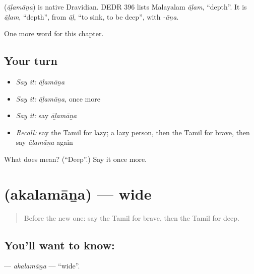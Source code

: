 \begin{cousinweb}
\textbf{} (\emph{āḻamāṉa}) is native Dravidian. DEDR 396 lists Malayalam \emph{āḻam}, \textquotedblleft{}depth\textquotedblright{}. It is \emph{āḻam}, \textquotedblleft{}depth\textquotedblright{}, from \emph{āḻ}, \textquotedblleft{}to sink, to be deep\textquotedblright{}, with \emph{-āṉa}.
\end{cousinweb}

\begin{grammarlens}[title={What you've built}]
One more word for this chapter.
\end{grammarlens}

\subsection*{Your turn}
\begin{itemize}
\raggedright
  \item \emph{Say it:} \emph{āḻamāṉa}
  \item \emph{Say it:} \emph{āḻamāṉa}, once more
  \item \emph{Say it:} say \emph{āḻamāṉa}
  \item \emph{Recall:} say the Tamil for lazy; a lazy person, then the Tamil for brave, then say \emph{āḻamāṉa} again
\end{itemize}

\begin{tcolorbox}[breakable,colback=teal!4,colframe=teal!35!black,title={Before you move on}]
What does  mean? (\textquotedblleft{}Deep\textquotedblright{}.) Say it once more.
\end{tcolorbox}
\section[\texorpdfstring{\ta{அகலமான} (akalamāṉa)}{அகலமான (akalamāṉa)}]{ (akalamāṉa) — wide}

\label{lesson:TA-C148-akalamana}



\begin{quote}
Before the new one: say the Tamil for brave, then the Tamil for deep.
\end{quote}

\subsection*{You'll want to know: }
\textbf{} — \emph{akalamāṉa} — \textquotedblleft{}wide\textquotedblright{}.

